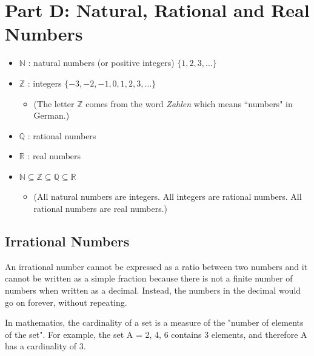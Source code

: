 \documentclass[]{report}
\begin{document}
\section*{Part D: Natural, Rational and Real Numbers}
\begin{itemize}
\item $\mathbb{N}$ : natural numbers (or positive integers) $\{1,2,3,\ldots\}$
\item $\mathbb{Z}$ : integers $\{-3,-2,-1,0,1,2,3,\ldots\}$
\begin{itemize}
\item (The letter $\mathbb{Z}$ comes from the word \emph{Zahlen} which means ``numbers" in German.)
\end{itemize}
\item $\mathbb{Q}$ : rational numbers
\item $\mathbb{R}$ : real numbers
\item $\mathbb{N} \subseteq \mathbb{Z } \subseteq \mathbb{Q} \subseteq \mathbb{R}$
\begin{itemize}
\item (All natural numbers are integers. All integers are rational numbers. All rational numbers are real numbers.)
\end{itemize}
\end{itemize}




\subsection{Irrational Numbers}
An irrational number cannot be expressed as a ratio between two numbers and it cannot be written as a simple fraction because there is not a finite number of numbers when written as a decimal. Instead, the numbers in the decimal would go on forever, without repeating.



In mathematics, the cardinality of a set is a measure of the "number of elements of the set". For example, the set A = {2, 4, 6} contains 3 elements, and therefore A has a cardinality of 3.
\end{document}
